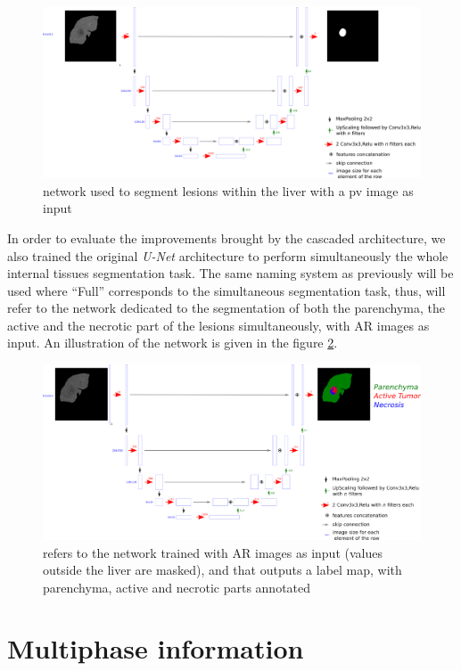 \begin{figure}[th!]
	\centering
	\includegraphics[width=0.9\linewidth]{../SemanticSeg/images/PV_Lesion}
	\caption{ network used to segment lesions within the liver with a \ac{pv} image as input}
	\label{CARS_PV_lesion_Fig}
\end{figure}


In order to evaluate the improvements brought by the cascaded
architecture, we also trained the original \emph{U-Net} architecture to
perform simultaneously the whole internal tissues segmentation task. The
same naming system as previously will be used where ``Full'' corresponds
to the simultaneous segmentation task, thus,  will refer to the
network dedicated to the segmentation of both the parenchyma, the active
and the necrotic part of the lesions simultaneously, with AR
images as input. An illustration of the network is given in the figure
\ref{CARS_ArFull_Fig}.

\begin{figure}[th!]
	\centering
	\includegraphics[width=0.9\linewidth]{../SemanticSeg/images/image23}
	\caption{ refers to the network trained with AR images as input (values outside the liver are masked), and that outputs a label map, with parenchyma, active and necrotic parts annotated}
	\label{CARS_ArFull_Fig}
\end{figure}


\section{Multiphase information} \label{sec:IJCARS_multiphase}

